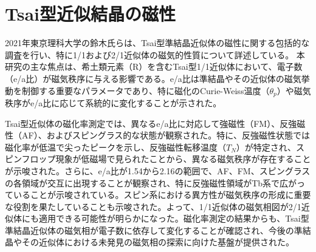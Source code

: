 \documentclass[11pt,a4j]{jreport}
\begin{document}
\section{Tsai型近似結晶の磁性}
2021年東京理科大学の鈴木氏らは、Tsai型準結晶近似体の磁性に関する包括的な調査を行い、特に1/1および2/1近似体の磁気的性質について詳述している。
本研究の主な焦点は、希土類元素（R）を含むTsai型1/1近似体において、電子数（e/a比）が磁気秩序に与える影響である。e/a比は準結晶やその近似体の磁気挙動を制御する重要なパラメータであり、特に磁化のCurie-Weiss温度（$\theta_p$）や磁気秩序がe/a比に応じて系統的に変化することが示された。\par
Tsai型近似体の磁化率測定では、異なるe/a比に対応して強磁性（FM）、反強磁性（AF）、およびスピングラス的な状態が観察された。特に、反強磁性状態では磁化率が低温で尖ったピークを示し、反強磁性転移温度（$T_N$）が特定され、スピンフロップ現象が低磁場で見られたことから、異なる磁気秩序が存在することが示唆された。さらに、e/a比が1.54から2.16の範囲で、AF、FM、スピングラスの各領域が交互に出現することが観察され、特に反強磁性領域がTb系で広がっていることが示唆されている。スピン系における異方性が磁気秩序の形成に重要な役割を果たしていることも示唆された。よって、1/1近似体の磁気相図が2/1近似体にも適用できる可能性が明らかになった。磁化率測定の結果からも、Tsai型準結晶近似体の磁気相が電子数に依存して変化することが確認され、今後の準結晶やその近似体における未発見の磁気相の探索に向けた基盤が提供された。
\end{document}

